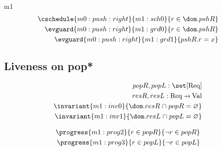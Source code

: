 \documentclass[12pt]{amsart}
\begin{document}
\begin{machine}{m1}
\begin{align*}
\weakento{m0:push:right}{default}{m1:sch0}
\\ \cschedule{m0:push:right}{m1:sch0}{ r \in \dom.pshR }
\\ \evguard{m0:push:right}{m1:grd0}{ r \in \dom.pshR }
\\ \evguard{m0:push:right}{m1:grd1}{ pshR.r = x }
\end{align*}

\subsection{Liveness on pop*}

\begin{align*}
\variable{ popR, popL : \set [\REQ]}
\\ \variable{ resR, resL : \REQ \pfun \G }
\\ \invariant{m1:inv0}{ \dom.resR \binter popR = \emptyset }
\\ \invariant{m1:inv1}{ \dom.resL \binter popL = \emptyset }
\end{align*}

\begin{align*}
\progress{m1:prog2}
	{ r \in popR }
	{ \neg r \in popR }
\\ \progress{m1:prog3}
	{ r \in popL }
	{ \neg r \in popL  }
\end{align*}


\end{machine}
\end{document}
